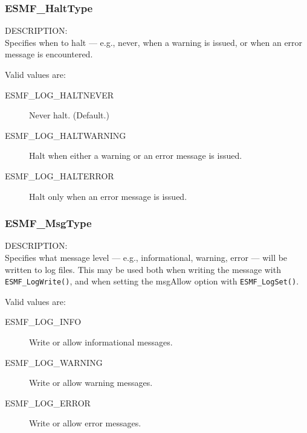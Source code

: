 

\subsubsection{ESMF\_HaltType}

\label{opt:Halttype}
{\sf DESCRIPTION:\\}
Specifies when to halt --- e.g., never, when a warning is issued, or when an
error message is encountered.

Valid values are:
\begin{description}
   \item [ESMF\_LOG\_HALTNEVER] 
         Never halt.  (Default.)
   \item [ESMF\_LOG\_HALTWARNING]
         Halt when either a warning or an error message is issued.
   \item [ESMF\_LOG\_HALTERROR]
         Halt only when an error message is issued.
\end{description}

\subsubsection{ESMF\_MsgType}

\label{opt:msgtype}
{\sf DESCRIPTION:\\}
Specifies what message level --- e.g., informational, warning, 
error --- will be written to log files.  This may be used both when
writing the message with {\tt ESMF\_LogWrite()}, and when setting the msgAllow
option with {\tt ESMF\_LogSet()}.

Valid values are:
\begin{description}
   \item [ESMF\_LOG\_INFO] 
         Write or allow informational messages.
   \item [ESMF\_LOG\_WARNING]
         Write or allow warning messages.
   \item [ESMF\_LOG\_ERROR]
         Write or allow error messages.
\end{description}


